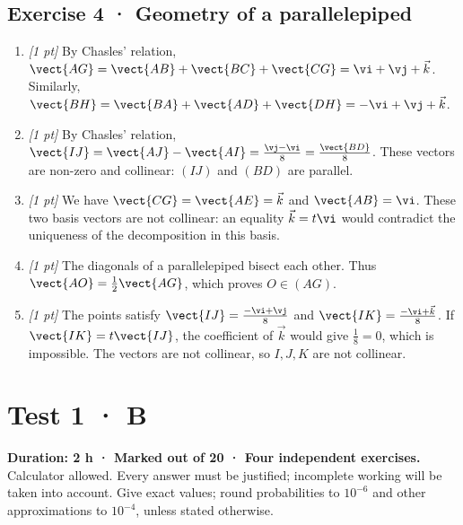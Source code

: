 \subsection*{Exercise 4 · Geometry of a parallelepiped}\begin{enumerate}

\item \textit{[1 pt]} By Chasles' relation, $\vect{AG}=\vect{AB}+\vect{BC}+\vect{CG}=\vi +\vj +\vec k$. Similarly, $\vect{BH}=\vect{BA}+\vect{AD}+\vect{DH}=-\vi +\vj +\vec k$.

\item \textit{[1 pt]} By Chasles' relation, $\vect{IJ}=\vect{AJ}-\vect{AI}=\frac{\vj -\vi }{8}=\frac{\vect{BD}}{8}$. These vectors are non-zero and collinear: $(IJ)$ and $(BD)$ are parallel.

\item \textit{[1 pt]} We have $\vect{CG}=\vect{AE}=\vec k$ and $\vect{AB}=\vi $. These two basis vectors are not collinear: an equality $\vec k=t\vi $ would contradict the uniqueness of the decomposition in this basis.

\item \textit{[1 pt]} The diagonals of a parallelepiped bisect each other. Thus $\vect{AO}=\frac12\vect{AG}$, which proves $O\in(AG)$.

\item \textit{[1 pt]} The points satisfy $\vect{IJ}=\frac{-\vi +\vj }{8}$ and $\vect{IK}=\frac{-\vi +\vec k}{8}$. If $\vect{IK}=t\vect{IJ}$, the coefficient of $\vec k$ would give $\frac{1}{8}=0$, which is impossible. The vectors are not collinear, so $I,J,K$ are not collinear.

\end{enumerate}

\fi

\fi

\ifmxteacher

\mxnewpage{}\label{sujet:1-4}

\section*{Test 1 · B}


\textbf{Duration: 2 h · Marked out of 20 · Four independent exercises.}\\Calculator allowed. Every answer must be justified; incomplete working will be taken into account. Give exact values; round probabilities to $10^{-6}$ and other approximations to $10^{-4}$, unless stated otherwise.

